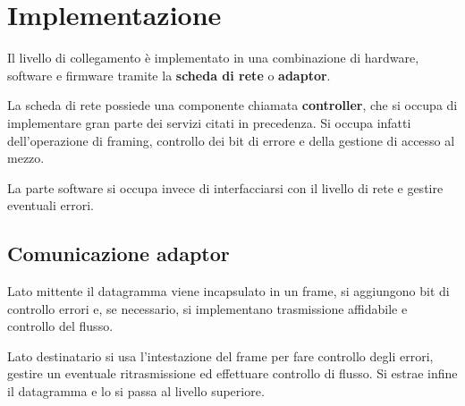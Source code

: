 \section{Implementazione}
Il livello di collegamento è implementato in una combinazione di 
hardware, software e firmware tramite la \textbf{scheda di rete} o 
\textbf{adaptor}.

La scheda di rete possiede una componente chiamata \textbf{controller},
che si occupa di implementare gran parte dei servizi citati in 
precedenza. Si occupa infatti dell'operazione di framing, controllo
dei bit di errore e della gestione di accesso al mezzo.

La parte software si occupa invece di interfacciarsi con il livello di
rete e gestire eventuali errori.

\subsection{Comunicazione adaptor}
Lato mittente il datagramma viene incapsulato in un frame, si 
aggiungono bit di controllo errori e, se necessario, si implementano
trasmissione affidabile e controllo del flusso.

Lato destinatario si usa l'intestazione del frame per fare controllo
degli errori, gestire un eventuale ritrasmissione ed effettuare 
controllo di flusso. Si estrae infine il datagramma e lo si passa al
livello superiore.
